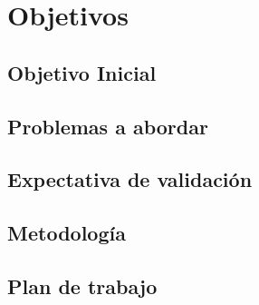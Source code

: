 \chapter{Objetivos}\label{cap.objetivos}
\section{Objetivo Inicial}
\section{Problemas a abordar}
\section{Expectativa de validación}
\section{Metodología}
\section{Plan de trabajo}